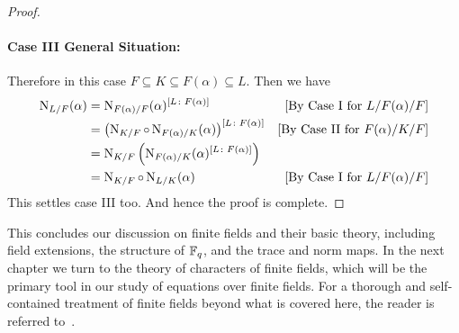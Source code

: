 \begin{proof}
  \paragraph*{Case III General Situation:} Therefore in this case $F\subseteq K\subseteq F(\alpha)\subseteq L$. Then we have \begin{align*}
    \operatorname{N}_{L/F}(\alpha) & = \operatorname{N}_{F(\alpha)/F}(\alpha)^{[L\colon F(\alpha)]}                          & [\text{By Case I for $L/F(\alpha)/F$}]  \\
                        & = \left(\operatorname{N}_{K/F}\circ \operatorname{N}_{F(\alpha)/K}(\alpha)\right)^{[L\colon F(\alpha)]} & [\text{By Case II for $F(\alpha)/K/F$}] \\
                        & =\operatorname{N}_{K/F}\left(\operatorname{N}_{F(\alpha)/K}(\alpha)^{[L\colon F(\alpha)]}\right)                                                  \\
                        & = \operatorname{N}_{K/F}\circ \operatorname{N}_{L/K}(\alpha)                                       & [\text{By Case I for $L/F(\alpha)/F$}]
  \end{align*}
  This settles case III too. And hence the proof is complete.
\end{proof}

This concludes our discussion on finite fields and their basic theory, including field extensions, the structure of $\mathbb{F}_q$, and the trace and norm maps. In the next chapter we turn to the theory of characters of finite fields, which will be the primary tool in our study of equations over finite fields. For a thorough and self-contained treatment of finite fields beyond what is covered here, the reader is referred to~\cite{Lidl1996}.

